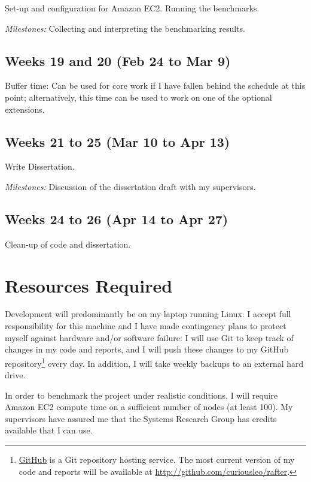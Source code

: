 \documentclass[12pt]{scrartcl}
\begin{document}
Set-up and configuration for Amazon \textsc{EC2}. Running the benchmarks.

\emph{Milestones:} Collecting and interpreting the benchmarking results.

\subsection{Weeks 19 and 20 (Feb 24 to Mar 9)%
  \label{weeks-19-and-20-feb-24-to-mar-9}%
}

Buffer time: Can be used for core work if I have fallen behind the schedule at this point; alternatively, this time can be used to work on one of the optional extensions.

\subsection{Weeks 21 to 25 (Mar 10 to Apr 13)%
  \label{weeks-21-to-25-mar-10-to-apr-13}%
}

Write Dissertation.

\emph{Milestones:} Discussion of the dissertation draft with my supervisors.

\subsection{Weeks 24 to 26 (Apr 14 to Apr 27)%
  \label{weeks-24-to-26-apr-14-to-apr-27}%
}

Clean-up of code and dissertation.

\section{Resources Required%
  \label{resources-required}%
}
%
Development will predominantly be on my laptop running Linux. I accept full responsibility for this machine and I have made contingency plans to protect myself against hardware and/or software failure: I will use Git to keep track of changes in my code and reports, and I will push these changes to my GitHub repository\footnote{\href{http://github.com}{GitHub} is a Git repository hosting service. The most current version of my code and reports will be available at \url{http://github.com/curiousleo/rafter}.}  every day. In addition, I will take weekly backups to an external hard drive.

In order to benchmark the project under realistic conditions, I will require Amazon \textsc{EC2} compute time on a sufficient number of nodes (at least 100). My supervisors have assured me that the Systems Research Group has credits available that I can use.



\end{document}

